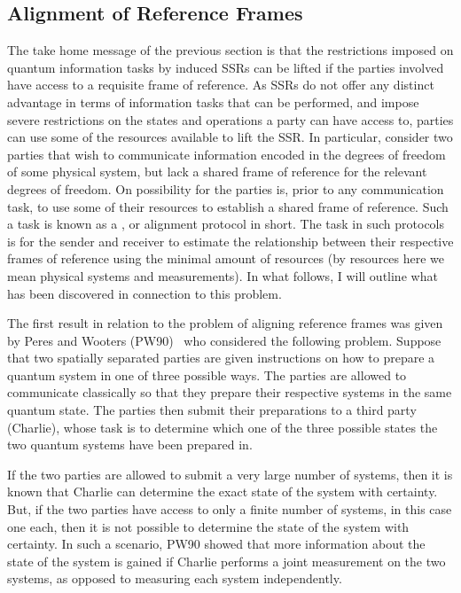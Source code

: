 \subsection{\label{RF}Alignment of Reference Frames}

The take home message of the previous section is that the restrictions imposed on quantum information tasks by induced SSRs can be lifted if the parties involved have access to a requisite frame of reference. As SSRs do not offer any distinct advantage in terms of information tasks that can be performed, and impose severe restrictions on the states and operations a party can have access to, parties can use some of the resources available to lift the SSR. In particular, consider two parties that wish to communicate information encoded in the degrees of freedom of some physical system, but lack a shared frame of reference for the relevant degrees of freedom.  On possibility for the parties is, prior to any communication task, to use some of their resources to establish a shared frame of reference.  Such a task is known as a , or alignment protocol in short. The task in such protocols is for the sender and receiver to estimate the relationship between their respective frames of reference using the minimal amount of resources (by resources here we mean physical systems and measurements). In what follows, I will outline what has been discovered in connection to this problem. 

The first result in relation to the problem of aligning reference frames was given by Peres and Wooters (PW90)~\cite{PW90} who considered the following problem.  Suppose that two spatially separated parties are given instructions on how to prepare a quantum system in one of three possible ways.  The parties are allowed to communicate classically so that they prepare their respective systems in the same quantum state.  The parties then submit their preparations to a third party (Charlie), whose task is to determine which one of the three possible states the two quantum systems have been prepared in. 

If the two parties are allowed to submit a very large number of systems, then it is known that Charlie can determine the exact state of the system with certainty.  But, if the two parties have access to only a finite number of systems, in this case one each, then it is not possible to determine the state of the system with certainty.  In such a scenario, PW90 showed that  more information about the state of the system is gained if Charlie performs a joint measurement on the two systems, as opposed to measuring each system independently.

